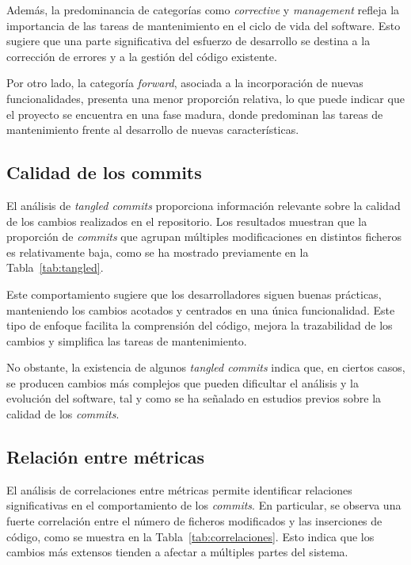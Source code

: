 \documentclass[a4paper, 12pt]{book}
\begin{document}
Además, la predominancia de categorías como \emph{corrective} y \emph{management} refleja la importancia de las tareas de mantenimiento en el ciclo de vida del software. Esto sugiere que una parte significativa del esfuerzo de desarrollo se destina a la corrección de errores y a la gestión del código existente.

Por otro lado, la categoría \emph{forward}, asociada a la incorporación de nuevas funcionalidades, presenta una menor proporción relativa, lo que puede indicar que el proyecto se encuentra en una fase madura, donde predominan las tareas de mantenimiento frente al desarrollo de nuevas características.

\subsection{Calidad de los commits}
\label{subsec:calidad}

El análisis de \emph{tangled commits} proporciona información relevante sobre la calidad de los cambios realizados en el repositorio. Los resultados muestran que la proporción de \emph{commits} que agrupan múltiples modificaciones en distintos ficheros es relativamente baja, como se ha mostrado previamente en la Tabla~\ref{tab:tangled}.

Este comportamiento sugiere que los desarrolladores siguen buenas prácticas, manteniendo los cambios acotados y centrados en una única funcionalidad. Este tipo de enfoque facilita la comprensión del código, mejora la trazabilidad de los cambios y simplifica las tareas de mantenimiento.

No obstante, la existencia de algunos \emph{tangled commits} indica que, en ciertos casos, se producen cambios más complejos que pueden dificultar el análisis y la evolución del software, tal y como se ha señalado en estudios previos sobre la calidad de los \emph{commits}.

\subsection{Relación entre métricas}
\label{subsec:relaciones}

El análisis de correlaciones entre métricas permite identificar relaciones significativas en el comportamiento de los \emph{commits}. En particular, se observa una fuerte correlación entre el número de ficheros modificados y las inserciones de código, como se muestra en la Tabla~\ref{tab:correlaciones}. Esto indica que los cambios más extensos tienden a afectar a múltiples partes del sistema.
\end{document}

